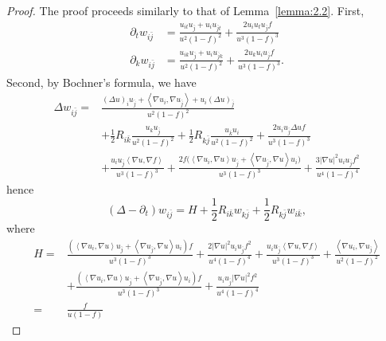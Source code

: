 \documentclass[10pt,a4paper]{amsart}
\begin{document}
\begin{proof}
    The proof proceeds similarly to that of Lemma~\ref{lemma:2.2}. First,
      \[
          \begin{aligned}
          \partial_t w_{i\bar{j}} &=
            \frac{u_{it}u_{\bar{j}}+u_{i}u_{\bar{j}t}}{u^{2}(1-f)^{2}}
            +
            \frac{2u_{i}u_{t}u_{\bar{j}}f}{u^{3}(1-f)^{3}}\\
          \partial_k w_{i\bar{j}} &=\frac{u_{ik}u_{\bar{j}}+u_{i}u_{\bar{j}k}}{u^{2}(1-f)^{2}}+\frac{2u_{k}u_{i}u_{\bar{j}}f}{u^{3}(1-f)^3}.
          \end{aligned}
      \]
    Second, by Bochner's formula, we have
    \[
    \begin{aligned}
      \Delta w_{i \bar{j}}  
        =&\frac{(\Delta u)_i u_{\bar{j}}+\left\langle\nabla u_i, \nabla u_{\bar{j}}\right\rangle+u_i\left(\Delta u\right)_{\bar{j}}}{u^2(1-f)^2} \\
      & +\frac{1}{2} R_{i \bar{k}} \frac{u_k u_{\bar{j}}}{u^2(1-f)^2}
        +\frac{1}{2} R_{k \bar{j}} \frac{u_{\bar{k}} u_i}{u^2(1-f)^2}
        +\frac{2 u_i u_{\bar{j}} \Delta u f}{u^3(1-f)^3} \\
      & +\frac{u_i u_{\bar{j}}\left\langle\nabla u,\nabla f\right\rangle}{u^3 (1-f)^3}
        +\frac{2 f\big(\left\langle \nabla u_i, \nabla u\right\rangle u_{\bar{j}}+\left\langle\nabla u_{\bar{j}}, \nabla u\right\rangle u_i\big)}{u^3(1-f)^3} 
      +\frac{3 | \nabla u|^2 u_i u_{\bar{j}} f^2}{u^4(1-f)^4}
    \end{aligned}
    \]
    hence
    \[
      (\Delta-\partial_t) w_{i \bar{j}}=H+\frac{1}{2} R_{i \bar{k}} w_{k \bar{j}}+\frac{1}{2} R_{k \bar{j}} w_{i \bar{k}},
    \]
    where
    \[
      \begin{aligned}
        H =&\frac{
          \left(
            \left\langle\nabla u_i, \nabla u\right\rangle u_{\bar{j}}+\left\langle\nabla u_{\bar{j}}, \nabla u\right\rangle u_i
          \right)f
        }{u^3(1-f)^3}
          +\frac{2|\nabla u|^2 u_i u_{\bar{j}} f^2}{u^4(1-f)^4} +\frac{u_i u_{\bar{j}}\left\langle\nabla u, \nabla f\right\rangle}{u^3(1-f)^3}
          +\frac{\left\langle\nabla u_i, \nabla u_{\bar{j}}\right\rangle}{u^2(1-f)^2} \\
        & +\frac{
          \left(
            \left\langle\nabla u_i, \nabla u\right\rangle u_{\bar{j}}+\left\langle\nabla u_{\bar{j}}, \nabla u\right\rangle u_i
          \right)f
        }{u^3(1-f)^3}
          +\frac{u_i u_{\bar{j}} | \nabla u |^2 f^2}{u^4(1-f)^4} \\
        =& \frac{f}{u(1-f)}

\end{aligned}\]
\end{proof}
\end{document}
